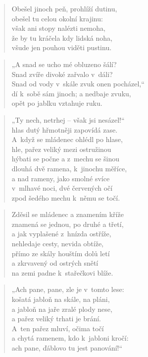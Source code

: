\begin{verse}
Obešel jinoch peň, prohlíží dutinu, \\
obešel tu celou okolní krajinu: \\
však ani stopy nalézti nemoha, \\
že by tu kráčela kdy lidská noha, \\
všude jen pouhou viděti pustinu.
\end{verse}

\begin{verse}
„A snad se ucho mé obluzeno šálí? \\
Snad zvíře divoké zařvalo v~dáli? \\
Snad od vody v~skále zvuk onen pocházel,“ \\
dí k~sobě sám jinoch; a nedbaje zvuku, \\
opět po jablku vztahuje ruku.
\end{verse}

\begin{verse}
„Ty nech, netrhej -- však jsi nesázel!“ \\
hlas dutý hřmotněji zapovídá zase. \\
A~když se mládenec ohlédl po hlase, \\
hle, pařez veliký mezi ostružinou \\
hýbati se počne a z~mechu se šinou \\
dlouhá dvě ramena, k~jinochu měříce, \\
a nad rameny, jako smolné svíce \\
v~mlhavé noci, dvé červených očí \\
zpod šedého mechu k~němu se točí.
\end{verse}

\begin{verse}
Zděsil se mládenec a znamením kříže \\
znamená se jednou, po druhé a třetí, \\
a jak vyplašené z~hnízda ostříže, \\
nehledaje cesty, nevida obtíže, \\
přímo ze skály houštím dolů letí \\
a zkrvavený od ostrých snětí \\
na zemi padne k~stařečkovi blíže.
\end{verse}

\begin{verse}
„Ach pane, pane, zle je v~tomto lese: \\
košatá jabloň na skále, na pláni, \\
a jabloň na jaře zralé plody nese, \\
a pařez veliký trhati je brání. \\
A~ten pařez mluví, očima točí \\
a chytá ramenem, kdo k~jabloni kročí: \\
ach pane, ďáblovo tu jest panování!“
\end{verse}

